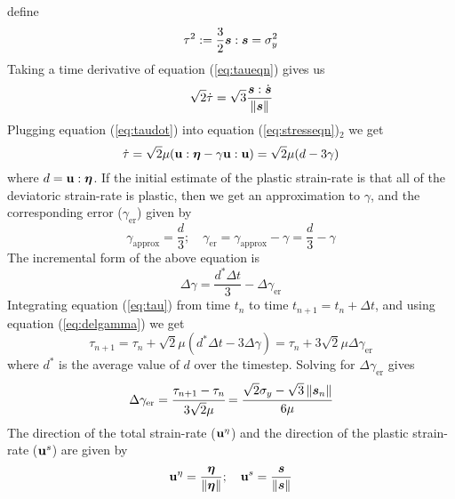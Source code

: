   define
  \begin{equation}\label{eq:taueqn}
    \tau^2 := \frac{3}{2} \Bs:\Bs = \sigma_y^2
  \end{equation}
  Taking a time derivative of equation (\ref{eq:taueqn}) gives us
  \begin{equation}\label{eq:taudot}
    \sqrt{2} \dot{\tau} = \sqrt{3} \frac{\Bs:\dot{\Bs}}{\norm{\Bs}}
  \end{equation}
  Plugging equation (\ref{eq:taudot}) into equation (\ref{eq:stresseqn})$_2$
  we get
  \begin{equation}\label{eq:tau}
    \dot{\tau} = \sqrt{2}\mu(\Bu:\Beta - \gamma\Bu:\Bu)
               = \sqrt{2} \mu (d - 3\gamma)
  \end{equation} 
  where $d = \Bu:\Beta$.  If the initial estimate of the plastic strain-rate
  is that all of the deviatoric strain-rate is plastic, then we get an 
  approximation to $\gamma$, and the corresponding error 
  ($\gamma_{\text{er}}$) given by
  \begin{equation}\label{eq:gammaer}
    \gamma_{\text{approx}} = \frac{d}{3}; \quad
    \gamma_{\text{er}} = \gamma_{\text{approx}} - \gamma = \frac{d}{3} - \gamma
  \end{equation}
  The incremental form of the above equation is
  \begin{equation}\label{eq:delgamma}
    \Delta\gamma = \frac{d^*\Delta t}{3} - \Delta\gamma_{\text{er}}
  \end{equation}
  Integrating equation (\ref{eq:tau}) from time $t_n$ to time $t_{n+1} = 
  t_n + \Delta t$, and using equation (\ref{eq:delgamma}) we get
  \begin{equation}\label{eq:taun}
    \tau_{n+1} = \tau_n + \sqrt{2}\mu(d^*\Delta t - 3\Delta\gamma)
               = \tau_n + 3\sqrt{2}\mu\Delta\gamma_{\text{er}}
  \end{equation}
  where $d^*$ is the average value of $d$ over the timestep.
  Solving for $\Delta\gamma_{\text{er}}$ gives
  \begin{equation}\label{eq:delgammaer}
    \Delta\gamma_{\text{er}} = \cfrac{\tau_{n+1} - \tau_n}{3\sqrt{2}\mu}
      = \cfrac{\sqrt{2}\sigma_y - \sqrt{3}\norm{\Bs_n}}{6\mu}
  \end{equation}
  The direction of the total strain-rate ($\Bu^{\eta}$) and the
  direction of the plastic strain-rate ($\Bu^s$) are given by 
  \begin{equation}
    \Bu^{\eta} = \frac{\Beta}{\norm{\Beta}} ; \quad
    \Bu^{s} = \frac{\Bs}{\norm{\Bs}} 
  \end{equation}
